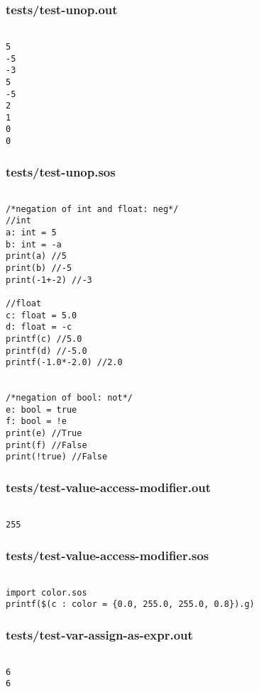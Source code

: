 \documentclass[main.tex]{subfiles}
\begin{document}
\subsubsection{tests/test-unop.out}

\begin{lstlisting}

5
-5
-3
5
-5
2
1
0
0
\end{lstlisting}

\subsubsection{tests/test-unop.sos}

\begin{lstlisting}

/*negation of int and float: neg*/
//int
a: int = 5
b: int = -a
print(a) //5
print(b) //-5
print(-1+-2) //-3

//float
c: float = 5.0
d: float = -c
printf(c) //5.0
printf(d) //-5.0
printf(-1.0*-2.0) //2.0


/*negation of bool: not*/
e: bool = true
f: bool = !e
print(e) //True
print(f) //False
print(!true) //False
\end{lstlisting}

\subsubsection{tests/test-value-access-modifier.out}

\begin{lstlisting}

255
\end{lstlisting}

\subsubsection{tests/test-value-access-modifier.sos}

\begin{lstlisting}

import color.sos
printf($(c : color = {0.0, 255.0, 255.0, 0.8}).g)\end{lstlisting}

\subsubsection{tests/test-var-assign-as-expr.out}

\begin{lstlisting}

6
6
\end{lstlisting}
\end{document}
